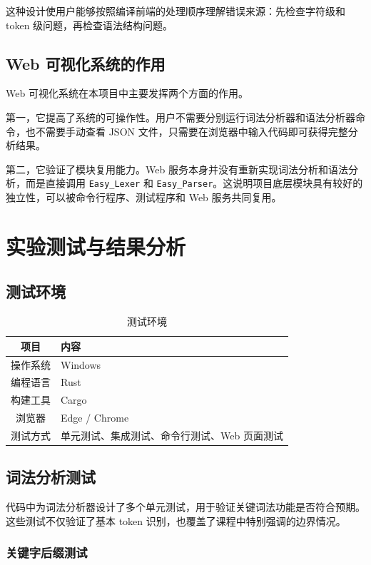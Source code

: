 \documentclass[UTF8,a4paper,12pt]{ctexart}
\begin{document}
这种设计使用户能够按照编译前端的处理顺序理解错误来源：先检查字符级和 token 级问题，再检查语法结构问题。

\subsection{Web 可视化系统的作用}

Web 可视化系统在本项目中主要发挥两个方面的作用。

第一，它提高了系统的可操作性。用户不需要分别运行词法分析器和语法分析器命令，也不需要手动查看 JSON 文件，只需要在浏览器中输入代码即可获得完整分析结果。

第二，它验证了模块复用能力。Web 服务本身并没有重新实现词法分析和语法分析，而是直接调用 \texttt{Easy\_Lexer} 和 \texttt{Easy\_Parser}。这说明项目底层模块具有较好的独立性，可以被命令行程序、测试程序和 Web 服务共同复用。
\section{实验测试与结果分析}

\subsection{测试环境}

\begin{table}[H]
    \centering
    \caption{测试环境}
    \begin{tabularx}{\textwidth}{c|Y}
        \toprule
        项目 & 内容 \\
        \midrule
        操作系统 & Windows \\
        编程语言 & Rust \\
        构建工具 & Cargo \\
        浏览器 & Edge / Chrome \\
        测试方式 & 单元测试、集成测试、命令行测试、Web 页面测试 \\
        \bottomrule
    \end{tabularx}
\end{table}

\subsection{词法分析测试}

代码中为词法分析器设计了多个单元测试，用于验证关键词法功能是否符合预期。这些测试不仅验证了基本 token 识别，也覆盖了课程中特别强调的边界情况。

\subsubsection{关键字后缀测试}
\end{document}
